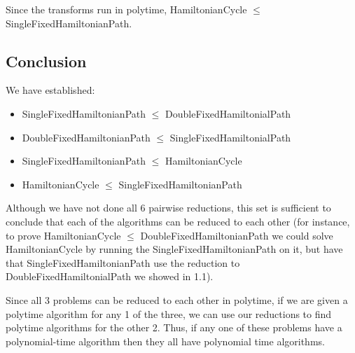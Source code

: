 \documentclass[a4paper]{article}
\begin{document}
Since the transforms run in polytime, HamiltonianCycle $\leq$ SingleFixedHamiltonianPath.

\subsection{Conclusion}
We have established:
\begin{itemize}
    \item SingleFixedHamiltonianPath $\leq$ DoubleFixedHamiltonialPath
    \item DoubleFixedHamiltonianPath $\leq$ SingleFixedHamiltonialPath
    \item SingleFixedHamiltonianPath $\leq$ HamiltonianCycle
    \item HamiltonianCycle $\leq$ SingleFixedHamiltonianPath
\end{itemize}

Although we have not done all 6 pairwise reductions, this set is sufficient to conclude that each of the algorithms can be reduced to each other (for instance, to prove HamiltonianCycle $\leq$ DoubleFixedHamiltonianPath we could solve HamiltonianCycle by running the SingleFixedHamiltonianPath on it, but have that SingleFixedHamiltonianPath use the reduction to DoubleFixedHamiltonialPath we showed in 1.1). 

Since all 3 problems can be reduced to each other in polytime, if we are given a polytime algorithm for any 1 of the three, we can use our reductions to find polytime algorithms for the other 2. Thus, if any one of these problems have a polynomial-time algorithm then they all have polynomial time algorithms.
\end{document}

